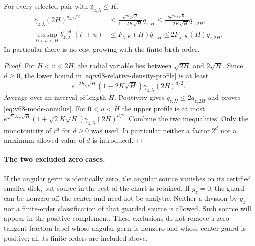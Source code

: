 \begin{proposition}
\label{prop:v68-annular-comparison}
For every selected pair with $\mathfrak p_{z,\lambda}\le K$,
\begin{align}
 \gamma_{z,\lambda}(2H)^{d_{z,\lambda}/2}
   &\le\frac{e^{2K_\chi\sqrt H}}{1-2K\sqrt H}
                       \overline q_{z,H}
    \le\frac{2e^{2K_\chi\sqrt H}}{1-2K\sqrt H}q_{z,2H},
                                                        \label{eq:v68-mode-annulus}\\
 \operatorname*{ess\,sup}_{0<u<H}
             b_{z,\lambda}^{\varepsilon,\mathrm{clr}}(t_z+u)
   &\le F_{\chi,K}(H)\overline q_{z,H}
    \le2F_{\chi,K}(H)q_{z,2H}.             \label{eq:v68-inner-annulus}
\end{align}
In particular there is no cost growing with the finite birth order.
\end{proposition}
\begin{proof}
For $H<v<2H$, the radial variable lies between $\sqrt{2H}$ and
$2\sqrt H$. Since $d\ge0$, the lower bound in
\eqref{eq:v68-relative-density-profile} is at least
\[
 e^{-2K_\chi\sqrt H}(1-2K\sqrt H)
                              \gamma_{z,\lambda}(2H)^{d/2}.
\]
Average over an interval of length $H$. Positivity gives
$\overline q_{z,H}\le2q_{z,2H}$ and proves
\eqref{eq:v68-mode-annulus}. For $0<u<H$ the upper profile is at
most
$e^{\sqrt2K_\chi\sqrt H}(1+\sqrt2K\sqrt H)
 \gamma_{z,\lambda}(2H)^{d/2}$.
Combine the two inequalities. Only the monotonicity of $r^d$ for
$d\ge0$ was used. In particular neither a factor $2^d$ nor a
maximum allowed value of $d$ is introduced.
\end{proof}

\paragraph{The two excluded zero cases.}
If the angular germ is identically zero, the angular source vanishes
on its certified smaller disk, but source in the rest of the chart
is retained. If $g_z=0$, the guard can be nonzero off the center and
need not be analytic. Neither a division by $g_z$ nor a finite-order
classification of that guarded source is allowed. Such source will
appear in the positive complement. These exclusions do not remove a
zero-tangent-fraction label whose angular germ is nonzero and whose
center guard is positive; all its finite orders are included above.
